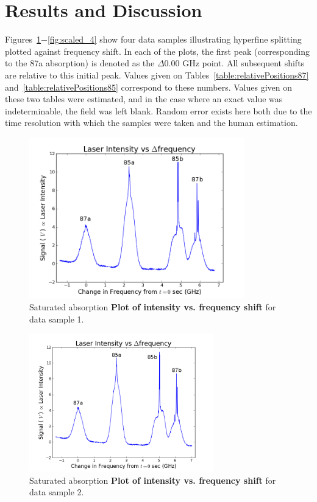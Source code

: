 \documentclass[paper=a4, fontsize=11pt]{scrartcl} %
\numberwithin{equation}{section}
\numberwithin{figure}{section}
\numberwithin{table}{section}
\begin{document}
\section{Results and Discussion}

Figures~\ref{fig:scaled_1}$-$\ref{fig:scaled_4} show four data samples illustrating hyperfine splitting plotted against frequency shift. In each of the plots, the first peak (corresponding to the 87a absorption) is denoted as the $\Delta 0.00$ GHz point. All subsequent shifts are relative to this initial peak. Values given on Tables~\ref{table:relativePositions87} and~\ref{table:relativePositions85} correspond to these numbers. Values given on these two tables were estimated, and in the case where an exact value was indeterminable, the field was left blank. Random error exists here both due to the time resolution with which the samples were taken and the human estimation.

\begin{figure}[H] \begin{center}
  \includegraphics[height=70mm]{4-2-009.png}
  \caption{Saturated absorption \textbf{Plot of intensity vs. frequency shift} for data sample 1. }
  \label{fig:scaled_1}
\end{center} \end{figure}

\begin{figure}[H] \begin{center}
  \includegraphics[height=60mm]{4-2-010.png}
  \caption{Saturated absorption \textbf{Plot of intensity vs. frequency shift} for data sample 2. }
  \label{fig:scaled_2}
\end{center} \end{figure}
\end{document}
